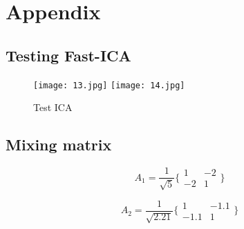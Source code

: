 \section{Appendix}

\subsection{Testing Fast-ICA}\label{A1}

\begin{figure}[!htbp]
%
\centering
\texttt{[image: 13.jpg]}
\endminipage\hfill
{}%
\centering
\texttt{[image: 14.jpg]}
\endminipage\hfill
\caption{Test ICA}
\end{figure}

\subsection{Mixing matrix}\label{A2}

\begin{equation}
A_{1}=\frac{1}{\sqrt{5}}    
\bigg\{
 \begin{matrix}
  1 & -2 \\
  -2 & 1 
 \end{matrix}
\bigg\}
\end{equation}

\begin{equation}
A_{2}=\frac{1}{\sqrt{2.21}}    
\bigg\{
 \begin{matrix}
  1 & -1.1 \\
  -1.1 & 1 
 \end{matrix}
\bigg\}
\end{equation}
